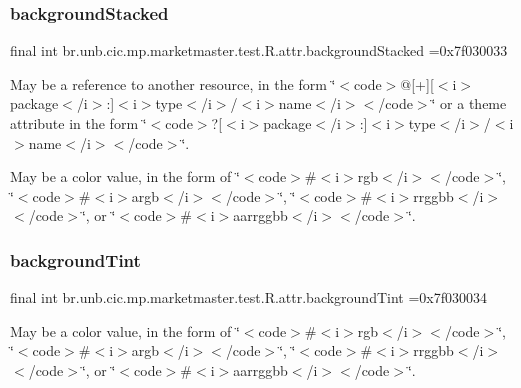 \subsubsection{\texorpdfstring{background\+Stacked}{backgroundStacked}}
{\footnotesize\ttfamily final int br.\+unb.\+cic.\+mp.\+marketmaster.\+test.\+R.\+attr.\+background\+Stacked =0x7f030033\hspace{0.3cm}{\ttfamily [static]}}

May be a reference to another resource, in the form \char`\"{}$<$code$>$@\mbox{[}+\mbox{]}\mbox{[}$<$i$>$package$<$/i$>$\+:\mbox{]}$<$i$>$type$<$/i$>$/$<$i$>$name$<$/i$>$$<$/code$>$\char`\"{} or a theme attribute in the form \char`\"{}$<$code$>$?\mbox{[}$<$i$>$package$<$/i$>$\+:\mbox{]}$<$i$>$type$<$/i$>$/$<$i$>$name$<$/i$>$$<$/code$>$\char`\"{}. 

May be a color value, in the form of \char`\"{}$<$code$>$\#$<$i$>$rgb$<$/i$>$$<$/code$>$\char`\"{}, \char`\"{}$<$code$>$\#$<$i$>$argb$<$/i$>$$<$/code$>$\char`\"{}, \char`\"{}$<$code$>$\#$<$i$>$rrggbb$<$/i$>$$<$/code$>$\char`\"{}, or \char`\"{}$<$code$>$\#$<$i$>$aarrggbb$<$/i$>$$<$/code$>$\char`\"{}. \mbox{\label{classbr_1_1unb_1_1cic_1_1mp_1_1marketmaster_1_1test_1_1R_1_1attr_ac5590e8318f8ef11000df9a4f089211f}} 
\subsubsection{\texorpdfstring{background\+Tint}{backgroundTint}}
{\footnotesize\ttfamily final int br.\+unb.\+cic.\+mp.\+marketmaster.\+test.\+R.\+attr.\+background\+Tint =0x7f030034\hspace{0.3cm}{\ttfamily [static]}}

May be a color value, in the form of \char`\"{}$<$code$>$\#$<$i$>$rgb$<$/i$>$$<$/code$>$\char`\"{}, \char`\"{}$<$code$>$\#$<$i$>$argb$<$/i$>$$<$/code$>$\char`\"{}, \char`\"{}$<$code$>$\#$<$i$>$rrggbb$<$/i$>$$<$/code$>$\char`\"{}, or \char`\"{}$<$code$>$\#$<$i$>$aarrggbb$<$/i$>$$<$/code$>$\char`\"{}. \mbox{\label{classbr_1_1unb_1_1cic_1_1mp_1_1marketmaster_1_1test_1_1R_1_1attr_a41216ceecbcd1cead6dbc45cc4f40240}} 
